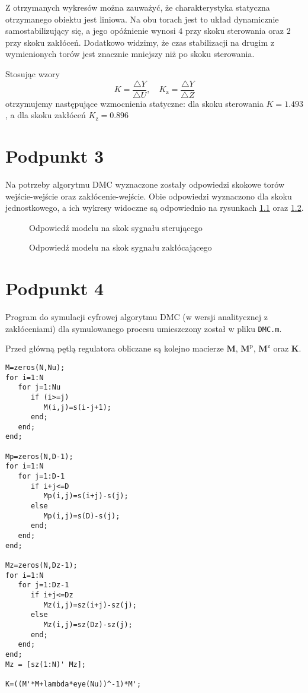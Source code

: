 Z otrzymanych wykresów można zauważyć, że charakterystyka statyczna otrzymanego obiektu jest liniowa. Na obu torach jest to układ dynamicznie samostabilizujący się, a jego opóźnienie wynosi $ \num{4} $ przy skoku sterowania oraz $ \num{2} $ przy skoku zakłóceń. Dodatkowo widzimy, że czas stabilizacji na drugim z wymienionych torów jest znacznie mniejszy niż po skoku sterowania. 

Stosując wzory
\begin{equation}
K = \frac{ \triangle Y }{ \triangle U},\quad K_{\mathrm{z}} = \frac{\triangle Y}{\triangle Z}
\end{equation}
otrzymujemy następujące wzmocnienia statyczne: dla skoku sterowania $ K = \num{1,493} $, a dla skoku zakłóceń $ K_\mathrm{z} = \num{0,896} $


\chapter{Podpunkt 3}
Na potrzeby algorytmu DMC wyznaczone zostały odpowiedzi skokowe torów wejście-wejście oraz zakłócenie-wejście. Obie odpowiedzi wyznaczono dla skoku jednostkowego, a ich wykresy widoczne są odpowiednio na rysunkach \ref{Z3a} oraz \ref{Z3b}.

\begin{figure}[ht]
\centering

\caption{Odpowiedź modelu na skok sygnału sterującego}
\label{Z3a}
\end{figure}

\begin{figure}[ht]
\centering

\caption{Odpowiedź modelu na skok sygnału zakłócającego}
\label{Z3b}
\end{figure}


\chapter{Podpunkt 4}
Program do symulacji cyfrowej algorytmu DMC (w wersji analitycznej z zakłóceniami) dla symulowanego procesu umieszczony został w pliku \verb+DMC.m+.

Przed główną pętlą regulatora obliczane są kolejno macierze $ \boldsymbol{M} $, $ \boldsymbol{M}^\mathrm{p}$, $ \boldsymbol{M}^\mathrm{z} $ oraz $ \boldsymbol{K} $.


\begin{lstlisting}[style=Matlab-editor]
%generacja macierzy
M=zeros(N,Nu);
for i=1:N
   for j=1:Nu
      if (i>=j)
         M(i,j)=s(i-j+1);
      end;
   end;
end;

Mp=zeros(N,D-1);
for i=1:N
   for j=1:D-1
      if i+j<=D
         Mp(i,j)=s(i+j)-s(j);
      else
         Mp(i,j)=s(D)-s(j);
      end;
   end;
end;

Mz=zeros(N,Dz-1);
for i=1:N
   for j=1:Dz-1
      if i+j<=Dz
         Mz(i,j)=sz(i+j)-sz(j);
      else
         Mz(i,j)=sz(Dz)-sz(j);
      end;
   end;
end;
Mz = [sz(1:N)' Mz];

K=((M'*M+lambda*eye(Nu))^-1)*M';
\end{lstlisting} 

